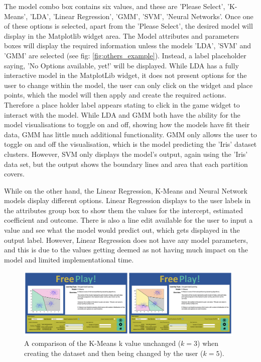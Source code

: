 		The model combo box contains six values, and these are 'Please Select', 'K-Means', 'LDA', 'Linear Regression', 'GMM', 'SVM', 'Neural Networks'. Once one of these options is selected, apart from the 'Please Select', the desired model will display in the Matplotlib widget area. The Model attributes and parameters boxes will display the required information unless the models 'LDA', 'SVM' and 'GMM' are selected (see fig: \ref{fig:others_example}). Instead, a label placeholder saying, 'No Options available, yet!' will be displayed. While LDA has a fully interactive model in the MatplotLib widget, it does not present options for the user to change within the model, the user can only click on the widget and place points, which the model will then apply and create the required actions. Therefore a place holder label appears stating to click in the game widget to interact with the model. While LDA and GMM both have the ability for the model visualisations to toggle on and off, showing how the models have fit their data, GMM has little much additional functionality. GMM only allows the user to toggle on and off the visualisation, which is the model predicting the 'Iris' dataset clusters. However, SVM only displays the model's output, again using the 'Iris' data set, but the output shows the boundary lines and area that each partition covers.
		
		While on the other hand, the Linear Regression, K-Means and Neural Network models display different options. Linear Regression displays to the user labels in the attributes group box to show them the values for the intercept, estimated coefficient and outcome. There is also a line edit available for the user to input a value and see what the model would predict out, which gets displayed in the output label. However, Linear Regression does not have any model parameters, and this is due to the values getting deemed as not having much impact on the model and limited implementational time. 
		
		\begin{figure}[t]
			\begin{center}
				\includegraphics[width=11cm]{graphics/chaning_k_fp_example.png}
				\caption{A comparison of the K-Means k value unchanged ($k=3$) when creating the dataset and then being changed by the user ($k=5$).}
				\label{fig:km_example}
			\end{center}
		\end{figure}
		
